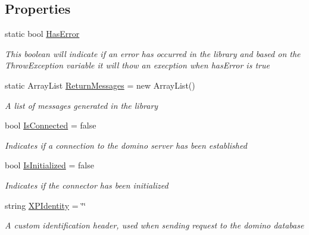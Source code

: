 \subsection*{Properties}
\begin{DoxyCompactItemize}
\item 
static bool \mbox{\hyperlink{class_connector_a9365777a6b7b711b75bcfa6c4d53e989}{Has\+Error}}
\begin{DoxyCompactList}\small\item\em This boolean will indicate if an error has occurred in the library and based on the Throw\+Exception variable it will thow an execption when has\+Error is true \end{DoxyCompactList}\item 
static Array\+List \mbox{\hyperlink{class_connector_a1ed422674b344524fd77998dcf6a9ba6}{Return\+Messages}} = new Array\+List()
\begin{DoxyCompactList}\small\item\em A list of messages generated in the library \end{DoxyCompactList}\item 
bool \mbox{\hyperlink{class_connector_a7e4bd5a6b59b228b169066b5f5ed4b0a}{Is\+Connected}} = false
\begin{DoxyCompactList}\small\item\em Indicates if a connection to the domino server has been established \end{DoxyCompactList}\item 
bool \mbox{\hyperlink{class_connector_ae9cbe0b51d601dab13ba7271db4f3883}{Is\+Initialized}} = false
\begin{DoxyCompactList}\small\item\em Indicates if the connector has been initialized \end{DoxyCompactList}\item 
string \mbox{\hyperlink{class_connector_a092e3e36f92c129c07c57df9b8fb91ca}{X\+P\+Identity}} = \char`\"{}\char`\"{}
\begin{DoxyCompactList}\small\item\em A custom identification header, used when sending request to the domino database \end{DoxyCompactList}\item 

\end{DoxyCompactItemize}

